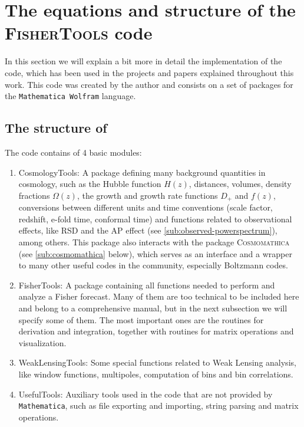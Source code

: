 \section{The equations and structure of the \textsc{FisherTools} code \label{sec:FisherTools-code}}

In this section we will explain a bit more in detail the 
implementation of the  \fito code, which has been used in the projects and papers
explained throughout this work.
This code was created by the author and consists on a set of packages for the \texttt{Mathematica Wolfram}
language.

\subsection{The structure of \fito \label{sub:fishertools}}

The code contains of 4 basic modules:
\begin{enumerate}
	\item CosmologyTools: A package defining many background quantities in cosmology, such as the Hubble function
	$H(z)$, distances, volumes, density fractions $\Omega(z)$, the growth and growth rate functions $D_{+}$ and $f(z)$,
	conversions between different units and time conventions (scale factor, redshift, e-fold time, conformal time) and functions
	related to observational effects, like RSD and the AP effect (see \cref{sub:observed-powerspectrum}), among others.
	This package also interacts with the package \textsc{Cosmomathica} (see \cref{sub:cosmomathica} below), which 
	serves as an interface and a wrapper to many other useful codes in the community,
	especially Boltzmann codes.
	\item FisherTools: A package containing all functions needed to perform and analyze a Fisher forecast. Many of them
	are too technical to be included here and belong to a comprehensive manual, but in the next subsection we will specify some of them.
	The most important ones are the routines for derivation and integration, together with routines for matrix operations and 
	visualization.
	\item WeakLensingTools: Some special functions related to Weak Lensing analysis, like window functions, multipoles,
	computation of bins and bin correlations.
	\item UsefulTools: Auxiliary tools used in the code that are not provided by \texttt{Mathematica},
	such as file exporting and importing, string parsing and matrix operations.
\end{enumerate}

